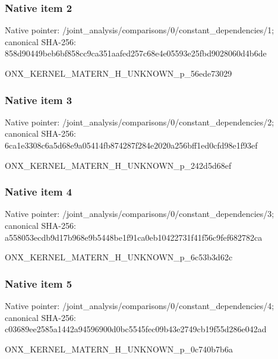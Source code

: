 \documentclass[10pt,a4paper]{article}
\begin{document}
\subsubsection{Native item 2}
Native pointer: /joint\_\allowbreak{}analysis/comparisons/0/constant\_\allowbreak{}dependencies/1; canonical SHA-256: 858d90449beb6bf858cc9ca351aafed257c68e4e05593e25fbd9028060d4b6de

\begingroup\raggedright\sloppy ONX\_\allowbreak{}KERNEL\_\allowbreak{}MATERN\_\allowbreak{}H\_\allowbreak{}UNKNOWN\_\allowbreak{}p\_\allowbreak{}56ede73029\par\endgroup

\subsubsection{Native item 3}
Native pointer: /joint\_\allowbreak{}analysis/comparisons/0/constant\_\allowbreak{}dependencies/2; canonical SHA-256: 6ca1e3308c6a5d68e9a05414fb874287f284e2020a256bff1ed0cfd98e1f93ef

\begingroup\raggedright\sloppy ONX\_\allowbreak{}KERNEL\_\allowbreak{}MATERN\_\allowbreak{}H\_\allowbreak{}UNKNOWN\_\allowbreak{}p\_\allowbreak{}242d5d68ef\par\endgroup

\subsubsection{Native item 4}
Native pointer: /joint\_\allowbreak{}analysis/comparisons/0/constant\_\allowbreak{}dependencies/3; canonical SHA-256: a558053ecdb9d17b968e9b5448be1f91ca0eb10422731f41f56c9fef682782ca

\begingroup\raggedright\sloppy ONX\_\allowbreak{}KERNEL\_\allowbreak{}MATERN\_\allowbreak{}H\_\allowbreak{}UNKNOWN\_\allowbreak{}p\_\allowbreak{}6c53b3d62c\par\endgroup

\subsubsection{Native item 5}
Native pointer: /joint\_\allowbreak{}analysis/comparisons/0/constant\_\allowbreak{}dependencies/4; canonical SHA-256: c03689ee2585a1442a94596900d0bc5545fec09b43e2749cb19f55d286e042ad

\begingroup\raggedright\sloppy ONX\_\allowbreak{}KERNEL\_\allowbreak{}MATERN\_\allowbreak{}H\_\allowbreak{}UNKNOWN\_\allowbreak{}p\_\allowbreak{}0c740b7b6a\par\endgroup
\end{document}
